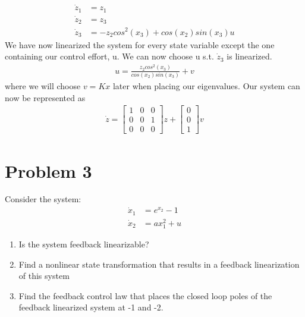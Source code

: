\documentclass{article}
\begin{document}
  \begin{align*}
    \dot{z}_1 &= z_1 \\
    \dot{z}_2 &= z_3 \\
    \dot{z}_3 &= -z_2cos^2(x_3) + cos(x_2)sin(x_3)u
  \end{align*}
  We have now linearized the system for every state variable except the one
  containing our control effort, u. We can now choose u s.t. $\dot{z}_3$ is
  linearized.
  \begin{align*}
    u = \frac{z_2cos^2(x_3)}{cos(x_2)sin(x_3)} + v
  \end{align*}
  where we will choose $v=Kx$ later when placing our eigenvalues. \newline
  Our system can now be represented as
  \begin{align*}
    \dot{z} = \begin{bmatrix}
      1 & 0 & 0 \\
      0 & 0 & 1 \\
      0 & 0 & 0 
    \end{bmatrix}z +
          \begin{bmatrix}
            0 \\
            0 \\
            1
          \end{bmatrix}v
  \end{align*}
 

  
  \newpage

  \section{Problem 3}

  Consider the system:
  \begin{align*}
    \dot{x}_1 &= e^{x_2} - 1 \\
    \dot{x}_2 &= ax_1^2 + u
  \end{align*}
  
  \begin{enumerate}[label=(\arabic*)]
    \item Is the system feedback linearizable?
    \item Find a nonlinear state transformation that results in a feedback
      linearization of this system
    \item Find the feedback control law that places the closed loop poles of the
      feedback linearized system at -1 and -2.
  \end{enumerate}
\end{document}

